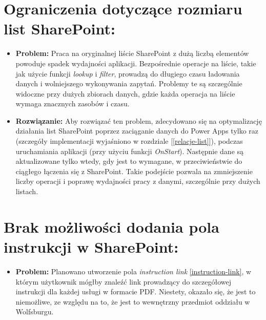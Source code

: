             \section*{Ograniczenia dotyczące rozmiaru list SharePoint:}
            \begin{itemize}
                  \item \textbf{Problem:} Praca na oryginalnej liście SharePoint z dużą liczbą elementów powoduje spadek wydajności aplikacji. Bezpośrednie operacje na liście, takie jak użycie funkcji \emph{lookup} i \emph{filter}, prowadzą do długiego czasu ładowania danych i wolniejszego wykonywania zapytań. Problemy te są szczególnie widoczne przy dużych zbiorach danych, gdzie każda operacja na liście wymaga znacznych zasobów i czasu.
                  \item \textbf{Rozwiązanie:} Aby rozwiązać ten problem, zdecydowano się na optymalizację działania list SharePoint poprzez zaciąganie danych do Power Apps tylko raz (szczegóły implementacji wyjaśniono w rozdziale [\ref{relacje-list}]), podczas uruchamiania aplikacji (przy użyciu funkcji \emph{OnStart}). Następnie dane są aktualizowane tylko wtedy, gdy jest to wymagane, w przeciwieństwie do ciągłego łączenia się z SharePoint. Takie podejście pozwala na zmniejszenie liczby operacji i poprawę wydajności pracy z danymi, szczególnie przy dużych listach.
            \end{itemize}
            \section*{Brak możliwości dodania pola instrukcji w SharePoint:}
            \begin{itemize}
                  \item \textbf{Problem:} Planowano utworzenie pola \emph{instruction link} \ref{instruction-link}, w którym użytkownik mógłby znaleźć link prowadzący do szczegółowej instrukcji dla każdej usługi w formacie PDF. Niestety, okazało się, że jest to niemożliwe, ze względu na to, że jest to wewnętrzny przedmiot oddziału w Wolfsburgu.
            \end{itemize}

